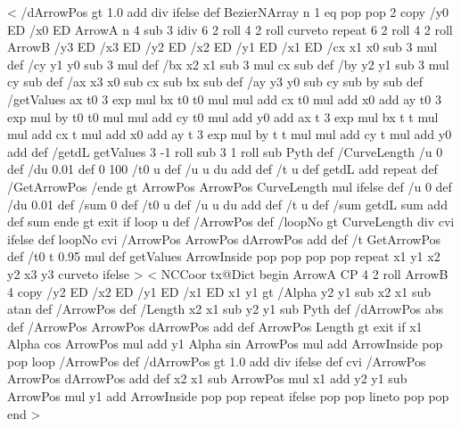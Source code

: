<{%
  /dArrowPos  gt {%
    1.0  add div
    }{ \psk@ArrowInsidePos } ifelse def
      BezierNArray
      n 1 eq { pop pop
      }{ 2 copy
        /y0 ED /x0 ED
        ArrowA
        n 4 sub 3 idiv { 6 2 roll 4 2 roll curveto } repeat
        6 2 roll
        4 2 roll
        ArrowB
        /y3 ED /x3 ED /y2 ED /x2 ED /y1 ED /x1 ED
        /cx x1 x0 sub 3 mul def
        /cy y1 y0 sub 3 mul def
        /bx x2 x1 sub 3 mul cx sub def
        /by y2 y1 sub 3 mul cy sub def
        /ax x3 x0 sub cx sub bx sub def
        /ay y3 y0 sub cy sub by sub def
        /getValues {
          ax t0 3 exp mul bx t0 t0 mul mul add cx t0 mul add x0 add
          ay t0 3 exp mul by t0 t0 mul mul add cy t0 mul add y0 add
          ax t 3 exp mul bx t t mul mul add cx t mul add x0 add
          ay t 3 exp mul by t t mul mul add cy t mul add y0 add
        } def
        /getdL {
          getValues
          3 -1 roll sub 3 1 roll sub Pyth
        } def
        /CurveLength {
          /u 0 def
          /du 0.01 def
          0 100 {
            /t0 u def
            /u u du add def
            /t u def
            getdL add
          } repeat } def
          /GetArrowPos {
            /ende \psk@ArrowInsidePos{} gt
              {ArrowPos}
              {ArrowPos CurveLength mul} ifelse def
            /u 0 def
            /du 0.01 def
            /sum 0 def
            { /t0 u def
              /u u du add def
              /t u def
              /sum getdL sum add def
              sum ende gt {exit} if
            } loop u
          } def
          /ArrowPos \psk@ArrowInsideOffset\space def
          /loopNo \psk@ArrowInsidePos{} gt {%
            CurveLength \psk@ArrowInsidePos\space div cvi
          }{ \psk@ArrowInsideNo } ifelse def
            loopNo cvi {
              /ArrowPos ArrowPos dArrowPos add def
              /t GetArrowPos def
              /t0 t 0.95 mul def
              getValues
              ArrowInside pop pop pop pop
            } repeat
            x1 y1 x2 y2 x3 y3 curveto
  } ifelse
}>
%
<{%
	NCCoor
	tx@Dict begin
	ArrowA CP 4 2 roll ArrowB
	4 copy
	/y2 ED /x2 ED /y1 ED /x1 ED
	x1 y1
	\psk@ArrowInsidePos{} gt {
		/Alpha y2 y1 sub x2 x1 sub atan def
		/ArrowPos \psk@ArrowInsideOffset\space def
		/Length x2 x1 sub y2 y1 sub Pyth def
		/dArrowPos \psk@ArrowInsidePos\space abs def
		{%
			/ArrowPos ArrowPos dArrowPos add def
			ArrowPos Length gt { exit } if
			x1 Alpha cos ArrowPos mul add
			y1 Alpha sin ArrowPos mul add
			ArrowInside
			pop pop
		} loop
	}{%
		/ArrowPos \psk@ArrowInsideOffset\space def
		/dArrowPos  gt {%
			1.0  add div
		}{ \psk@ArrowInsidePos } ifelse def
		\psk@ArrowInsideNo\space cvi {
			/ArrowPos ArrowPos dArrowPos add def
			x2 x1 sub ArrowPos mul x1 add
			y2 y1 sub ArrowPos mul y1 add
			ArrowInside
			pop pop
		} repeat
	} ifelse
	pop pop lineto pop pop
	end%
}>
